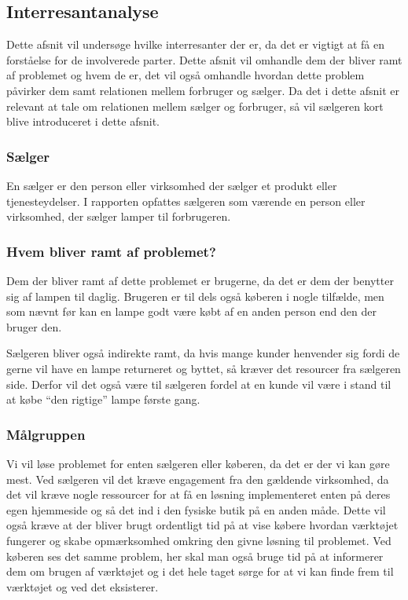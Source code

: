 \subsection{Interresantanalyse}

 Dette afsnit vil undersøge hvilke interresanter der er, da det er vigtigt at få en forståelse for de involverede parter. Dette afsnit vil omhandle dem der bliver ramt af problemet og hvem de er, det vil også omhandle hvordan dette problem påvirker dem samt relationen mellem forbruger og sælger. Da det i dette afsnit er relevant at tale om relationen mellem sælger og forbruger, så vil sælgeren kort blive introduceret i dette afsnit.

 \subsubsection{Sælger}
En sælger er den person eller virksomhed der sælger et produkt eller tjenesteydelser. I rapporten opfattes sælgeren som værende en person eller virksomhed, der sælger lamper til forbrugeren. 

\subsubsection{Hvem bliver ramt af problemet?}
Dem der bliver ramt af dette problemet er brugerne, da det er dem der benytter sig af lampen til daglig. Brugeren er til dels også køberen i nogle tilfælde, men som nævnt før kan en lampe godt være købt af en anden person end den der bruger den.

Sælgeren bliver også indirekte ramt, da hvis mange kunder henvender sig fordi de gerne vil have en lampe returneret og byttet, så kræver det resourcer fra sælgeren side. Derfor vil det også være til sælgeren fordel at en kunde vil være i stand til at købe “den rigtige” lampe første gang.
 
\subsubsection{Målgruppen}
Vi vil løse problemet for enten sælgeren eller køberen, da det er der vi kan gøre mest. Ved sælgeren vil det kræve engagement fra den gældende virksomhed, da det vil kræve nogle ressourcer for at få en løsning implementeret enten på deres egen hjemmeside og så det ind i den fysiske butik på en anden måde. Dette vil også kræve at der bliver brugt ordentligt tid på at vise købere hvordan værktøjet fungerer og skabe opmærksomhed omkring den givne løsning til problemet.
Ved køberen ses det samme problem, her skal man også bruge tid på at informerer dem om brugen af værktøjet og i det hele taget sørge for at vi kan finde frem til værktøjet og ved det eksisterer.
 
